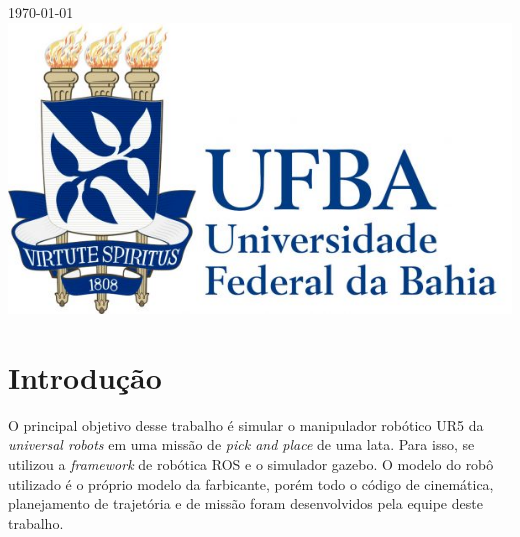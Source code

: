 \begin{titlepage}

{\large \today}\\[2cm] %


\includegraphics[scale=0.3]{images/ufba_logo.jpg}\\[1cm] %
 

\vfill %

\end{titlepage}


\section{Introdução}

O principal objetivo desse trabalho é simular o manipulador robótico UR5
da \textit{universal robots} em uma missão de \textit{pick and place} de 
uma lata. Para isso, se utilizou a \textit{framework} de robótica ROS 
e o simulador gazebo. O modelo do robô utilizado é o próprio modelo da 
farbicante, porém todo o código de cinemática, planejamento de trajetória e
de missão foram desenvolvidos pela equipe deste trabalho.

